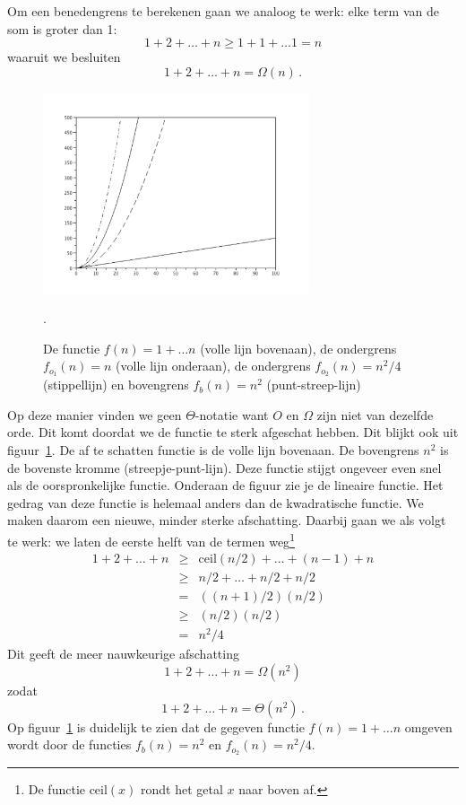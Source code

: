 Om een benedengrens te berekenen gaan we analoog te werk: elke term van de som is groter dan 1:
\[
1+2+\dots+n\geq1+1+\ldots1=n
\]
waaruit we besluiten
\[
1+2+\dots+n=\Omega(n)\,.
\]
\begin{figure}[htbp]
\begin{center}
\includegraphics[width=0.7\textwidth]{figuren/telproblemen/03voorbeeld}
\caption{De functie $f(n)=1+\dots n$ (volle lijn bovenaan), de ondergrens $f_{o_1}(n)=n$ (volle lijn onderaan), de ondergrens $f_{o_2}(n)=n^2/4$ (stippellijn) en bovengrens $f_b(n)=n^2$ (punt-streep-lijn)}.
\label{fig:03voorbeeld}
\end{center}
\end{figure}

Op deze manier vinden we geen $\Theta$-notatie want $O$ en $\Omega$ zijn niet van dezelfde orde. Dit komt doordat we de functie te sterk afgeschat hebben. Dit blijkt ook uit figuur~\ref{fig:03voorbeeld}. De af te schatten functie is de volle lijn bovenaan. De bovengrens $n^2$ is de bovenste kromme (streepje-punt-lijn). Deze functie stijgt ongeveer even snel als de oorspronkelijke functie.  Onderaan de figuur zie je de lineaire functie. Het gedrag van deze functie is helemaal anders dan de kwadratische functie. We maken daarom een nieuwe, minder sterke afschatting. Daarbij gaan we als volgt te werk: we laten de eerste helft van de termen weg\footnote{De functie $\text{ceil}(x)$ rondt het getal $x$ naar boven af.}
\begin{eqnarray*}
1+2+\dots+n&\geq& \text{ceil}(n/2)+\ldots+(n-1)+n\\&\geq& n/2+\ldots+n/2+n/2\\
&=&((n+1)/2)(n/2) \\
&\geq& (n/2)(n/2)\\&=&n^2/4
\end{eqnarray*}
Dit geeft de meer nauwkeurige afschatting
\[1+2+\dots+n=\Omega(n^2)
\]
zodat
\[
1+2+\dots+n=\Theta(n^2)\,.
\]
Op figuur~\ref{fig:03voorbeeld} is duidelijk te zien dat de gegeven functie $f(n)=1+\dots n$ omgeven wordt door de functies $f_b(n)=n^2$ en $f_{o_2}(n)=n^2/4$.

